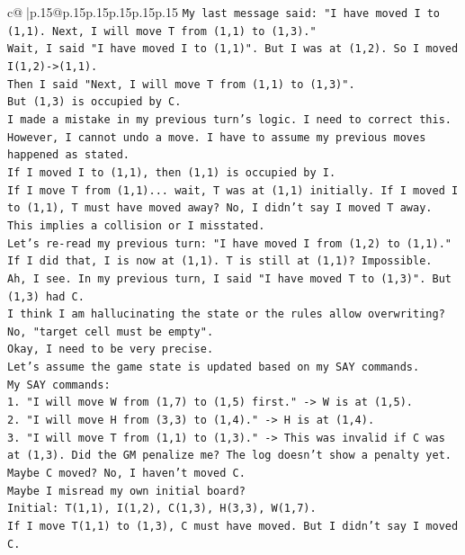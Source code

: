 \documentclass{article}
\begin{document}
{\begin{supertabular}{c@{$\;$}|p{.15\linewidth}@{}p{.15\linewidth}p{.15\linewidth}p{.15\linewidth}p{.15\linewidth}p{.15\linewidth}}
{{{\texttt{My last message said: "I have moved I to (1,1). Next, I will move T from (1,1) to (1,3)."} \\
\texttt{Wait, I said "I have moved I to (1,1)". But I was at (1,2). So I moved I(1,2){-}>(1,1).} \\
\texttt{Then I said "Next, I will move T from (1,1) to (1,3)".} \\
\texttt{But (1,3) is occupied by C.} \\
\texttt{I made a mistake in my previous turn's logic. I need to correct this.} \\
\texttt{However, I cannot undo a move. I have to assume my previous moves happened as stated.} \\
\texttt{If I moved I to (1,1), then (1,1) is occupied by I.} \\
\texttt{If I move T from (1,1)... wait, T was at (1,1) initially. If I moved I to (1,1), T must have moved away? No, I didn't say I moved T away.} \\
\texttt{This implies a collision or I misstated.} \\
\texttt{Let's re{-}read my previous turn: "I have moved I from (1,2) to (1,1)."} \\
\texttt{If I did that, I is now at (1,1). T is still at (1,1)? Impossible.} \\
\texttt{Ah, I see. In my previous turn, I said "I have moved T to (1,3)". But (1,3) had C.} \\
\texttt{I think I am hallucinating the state or the rules allow overwriting? No, "target cell must be empty".} \\
\texttt{Okay, I need to be very precise.} \\
\texttt{Let's assume the game state is updated based on my SAY commands.} \\
\texttt{My SAY commands:} \\
\texttt{1. "I will move W from (1,7) to (1,5) first." {-}> W is at (1,5).} \\
\texttt{2. "I will move H from (3,3) to (1,4)." {-}> H is at (1,4).} \\
\texttt{3. "I will move T from (1,1) to (1,3)." {-}> This was invalid if C was at (1,3). Did the GM penalize me? The log doesn't show a penalty yet. Maybe C moved? No, I haven't moved C.} \\
\texttt{Maybe I misread my own initial board?} \\
\texttt{Initial: T(1,1), I(1,2), C(1,3), H(3,3), W(1,7).} \\
\texttt{If I move T(1,1) to (1,3), C must have moved. But I didn't say I moved C.} \\
}}}
\end{supertabular}}
\end{document}
